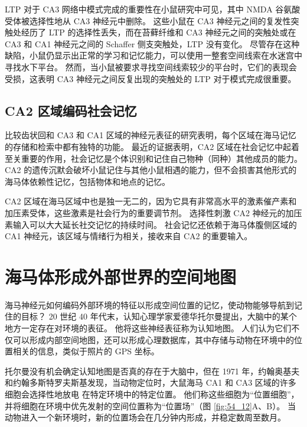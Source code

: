 LTP 对于 CA3 网络中模式完成的重要性在小鼠研究中可见，其中 NMDA 谷氨酸受体被选择性地从 CA3 神经元中删除。 这些小鼠在 CA3 神经元之间的复发性突触处经历了 LTP 的选择性丢失，而在苔藓纤维和 CA3 神经元之间的突触处或在 CA3 和 CA1 神经元之间的 Schaffer 侧支突触处，LTP 没有变化。 尽管存在这种缺陷，小鼠仍显示出正常的学习和记忆能力，可以使用一整套空间线索在水迷宫中寻找水下平台。 然而，当小鼠被要求寻找空间线索较少的平台时，它们的表现会受损，这表明 CA3 神经元之间反复出现的突触处的 LTP 对于模式完成很重要。

\subsection{CA2 区域编码社会记忆}

比较齿状回和 CA3 和 CA1 区域的神经元表征的研究表明，每个区域在海马记忆的存储和检索中都有独特的功能。 最近的证据表明，CA2 区域在社会记忆中起着至关重要的作用，社会记忆是个体识别和记住自己物种（同种）其他成员的能力。 CA2 的遗传沉默会破坏小鼠记住与其他小鼠相遇的能力，但不会损害其他形式的海马体依赖性记忆，包括物体和地点的记忆。

CA2 区域在海马区域中也是独一无二的，因为它具有非常高水平的激素催产素和加压素受体，这些激素是社会行为的重要调节剂。 选择性刺激 CA2 神经元的加压素输入可以大大延长社交记忆的持续时间。 社会记忆还依赖于海马体腹侧区域的 CA1 神经元，该区域与情绪行为相关，接收来自 CA2 的重要输入。

\section{海马体形成外部世界的空间地图}
海马神经元如何编码外部环境的特征以形成空间位置的记忆，使动物能够导航到记住的目标？ 20 世纪 40 年代末，认知心理学家爱德华托尔曼提出，大脑中的某个地方一定存在对环境的表征。 他将这些神经表征称为认知地图。 人们认为它们不仅可以形成内部空间地图，还可以形成心理数据库，其中存储与动物在环境中的位置相关的信息，类似于照片的 GPS 坐标。

托尔曼没有机会确定认知地图是否真的存在于大脑中，但在 1971 年，约翰奥基夫和约翰多斯特罗夫斯基发现，当动物定位时，大鼠海马 CA1 和 CA3 区域的许多细胞会选择性地放电 在特定环境中的特定位置。 他们称这些细胞为“位置细胞”，并将细胞在环境中优先发射的空间位置称为“位置场”（图 \ref{fig:54_12}A、B）。 当动物进入一个新环境时，新的位置场会在几分钟内形成，并稳定数周至数月。

